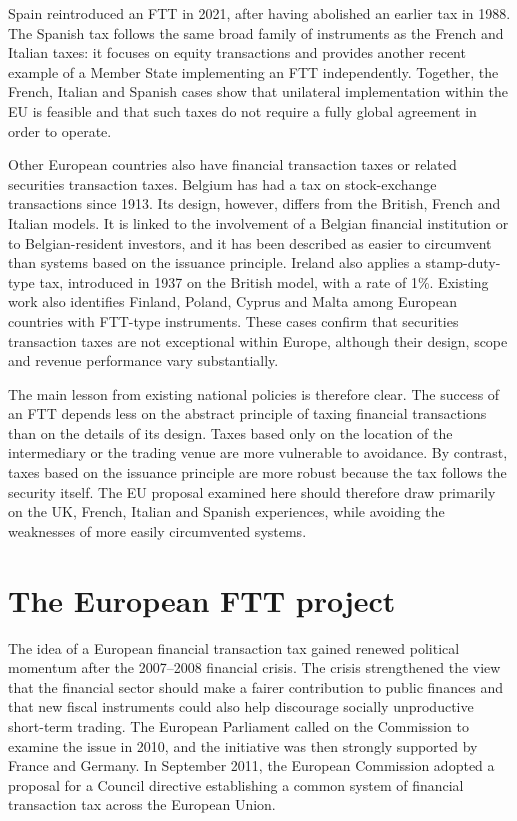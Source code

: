 \documentclass[../../main]{subfiles}
\begin{document}
Spain reintroduced an FTT in 2021, after having abolished an earlier tax in 1988. The Spanish tax follows the same broad family of instruments as the French and Italian taxes: it focuses on equity transactions and provides another recent example of a Member State implementing an FTT independently. Together, the French, Italian and Spanish cases show that unilateral implementation within the EU is feasible and that such taxes do not require a fully global agreement in order to operate.

Other European countries also have financial transaction taxes or related securities transaction taxes. Belgium has had a tax on stock-exchange transactions since 1913. Its design, however, differs from the British, French and Italian models. It is linked to the involvement of a Belgian financial institution or to Belgian-resident investors, and it has been described as easier to circumvent than systems based on the issuance principle. Ireland also applies a stamp-duty-type tax, introduced in 1937 on the British model, with a rate of 1\%. Existing work also identifies Finland, Poland, Cyprus and Malta among European countries with FTT-type instruments. These cases confirm that securities transaction taxes are not exceptional within Europe, although their design, scope and revenue performance vary substantially.

The main lesson from existing national policies is therefore clear. The success of an FTT depends less on the abstract principle of taxing financial transactions than on the details of its design. Taxes based only on the location of the intermediary or the trading venue are more vulnerable to avoidance. By contrast, taxes based on the issuance principle are more robust because the tax follows the security itself. The EU proposal examined here should therefore draw primarily on the UK, French, Italian and Spanish experiences, while avoiding the weaknesses of more easily circumvented systems.

\section{The European FTT project}

The idea of a European financial transaction tax gained renewed political momentum after the 2007--2008 financial crisis. The crisis strengthened the view that the financial sector should make a fairer contribution to public finances and that new fiscal instruments could also help discourage socially unproductive short-term trading. The European Parliament called on the Commission to examine the issue in 2010, and the initiative was then strongly supported by France and Germany. In September 2011, the European Commission adopted a proposal for a Council directive establishing a common system of financial transaction tax across the European Union.
\end{document}
